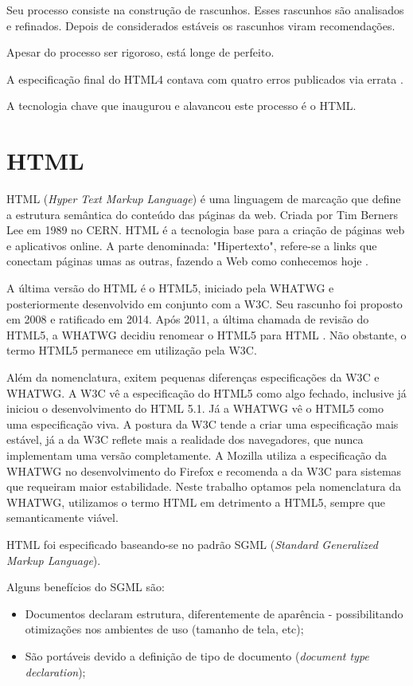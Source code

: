 \documentclass[
12pt,
a4paper,
portuges,
draft
]{report}
\begin{document}
Seu processo consiste na  construção de rascunhos. Esses rascunhos são 
analisados e refinados. Depois de considerados estáveis os rascunhos viram recomendações.

Apesar do processo ser rigoroso, está longe de perfeito.

A especificação final do HTML4 contava com quatro erros publicados via errata \autocite{HTML5}.

A tecnologia chave que inaugurou e alavancou este processo é o HTML.
\section{HTML}

HTML (\textit{Hyper Text Markup Language}) é uma linguagem de
marcação que define a estrutura semântica do conteúdo das páginas
da web. Criada por Tim Berners Lee em 1989 no CERN. HTML é a tecnologia
base para a criação de páginas web e aplicativos online. A parte
denominada: "Hipertexto", refere-se a links que conectam páginas umas
as outras, fazendo a Web como conhecemos hoje
\autocite{mdn2015}.

A última versão do HTML é o HTML5, iniciado pela WHATWG
e posteriormente desenvolvido em conjunto com a W3C.
Seu rascunho foi proposto em 2008 e ratificado em 2014.
Após 2011, a última chamada de revisão do HTML5,
a WHATWG decidiu renomear o HTML5 para HTML
\autocite{htmlIsTheNewHtml5}. Não obstante, o termo HTML5
permanece em utilização pela W3C.

Além da nomenclatura, exitem pequenas diferenças especificações da W3C e WHATWG. A
W3C vê a especificação do HTML5 como algo fechado, inclusive já
iniciou o desenvolvimento do HTML 5.1. Já a WHATWG vê o HTML5 como uma
especificação viva. A postura da W3C tende a criar uma especificação
mais estável, já a da W3C reflete mais a realidade dos navegadores,
que nunca implementam uma versão completamente. A Mozilla utiliza a
especificação da WHATWG no desenvolvimento do Firefox e recomenda a
da W3C para sistemas que requeiram maior estabilidade. Neste trabalho
optamos pela nomenclatura da WHATWG, utilizamos o termo HTML em
detrimento a HTML5, sempre que semanticamente viável.

HTML foi especificado baseando-se no padrão SGML (\textit{Standard Generalized
Markup Language}).

Alguns benefícios do SGML são:
\begin{itemize}
    \item Documentos declaram estrutura, diferentemente de aparência
- possibilitando otimizações nos ambientes de uso (tamanho de tela,
etc);
    \item São portáveis devido a definição de tipo de documento
(\textit{document type declaration});
\end{itemize}
\end{document}
